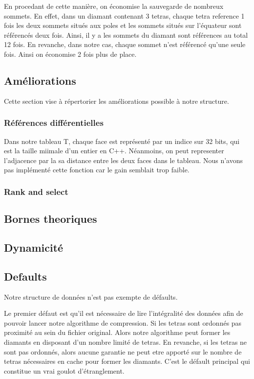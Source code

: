 \documentclass[a4paper,11pt,openany]{article}
\begin{document}
En procedant de cette manière, on économise la sauvegarde de nombreux sommets. En effet, dans un diamant contenant 3 tetras, chaque tetra reference 1 fois les deux sommets situés aux poles et les sommets situés sur l'équateur sont référencés deux fois. Ainsi, il y a les sommets du diamant sont références au total 12 fois.
En revanche, dans notre cas, chaque sommet n'est référencé qu'une seule fois. Ainsi on économise 2 fois plus de place.


\subsection{Améliorations}
Cette section vise à répertorier les améliorations possible à notre structure.
\subsubsection{Références différentielles}
Dans notre tableau T, chaque face est représenté par un indice sur 32 bits, qui est la taille miimale d'un entier en C++. Néanmoins, on peut representer l'adjacence par la sa distance entre les deux faces dans le tableau. Nous n'avons pas implémenté cette fonction car le gain semblait trop faible.
\subsubsection{Rank and select}

\subsection{Bornes theoriques}

\subsection{Dynamicité}


\subsection{Defaults}
Notre structure de données n'est pas exempte de défaults.

Le premier défaut est qu'il est nécessaire de lire l'intégralité des données afin de pouvoir lancer notre algorithme de compression. Si les tetras sont ordonnés pas proximité au sein du fichier original. Alors notre algorithme peut former les diamants en disposant d'un nombre limité de tetras. En revanche, si les tetras ne sont pas ordonnés, alors aucune garantie ne peut etre apporté sur le nombre de tetras nécessaires en cache pour former les diamants. 
C'est le défault principal qui constitue un vrai goulot d'étranglement.
\end{document}

